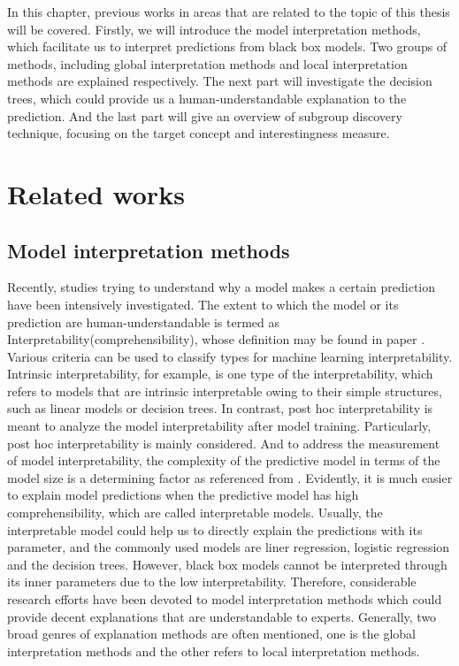 In this chapter, previous works in areas that are related to the topic of this thesis will be covered. Firstly, we will introduce the model interpretation methods, which facilitate us to interpret predictions from black box models. Two groups of methods, including global interpretation methods and local interpretation methods are explained respectively. The next part will investigate the decision trees, which could provide us a human-understandable explanation to the prediction. And the last part will give an overview of subgroup discovery technique, focusing on the target concept and interestingness measure. 

\section{Related works}

\subsection{Model interpretation methods}

Recently, studies trying to understand why a model makes a certain prediction have been intensively investigated. The extent to which the model or its prediction are human-understandable is termed as Interpretability(comprehensibility), whose definition may be found in paper \cite{kim2016examples}. Various criteria can be used to classify types for machine learning interpretability. Intrinsic interpretability, for example, is one type of the interpretability, which refers to models that are intrinsic interpretable owing to their simple structures, such as linear models or decision trees. In contrast, post hoc interpretability is meant to analyze the model interpretability after model training. Particularly, post hoc interpretability is mainly considered. And to address the measurement of model interpretability, the complexity of the predictive model in terms of the model size is a determining factor as referenced from \cite{freitas2014comprehensible}. Evidently, it is much easier to explain model predictions when the predictive model has high comprehensibility, which are called interpretable models. Usually, the interpretable model could help us to directly explain the predictions with its parameter, and the commonly used models are liner regression, logistic regression and the decision trees. However, black box models cannot be interpreted through its inner parameters due to the low interpretability. Therefore, considerable research efforts have been devoted to model interpretation methods which could provide decent explanations that are understandable to experts. Generally, two broad genres of explanation methods are often mentioned, one is the global interpretation methods and the other refers to local interpretation methods.


